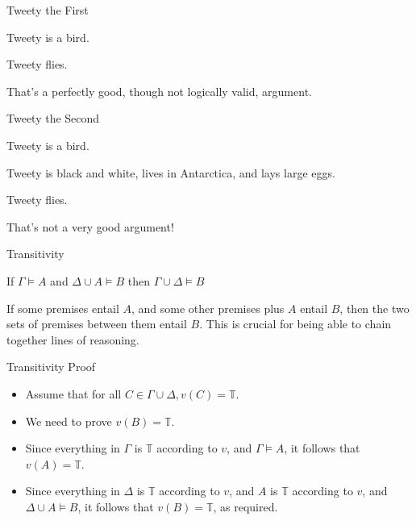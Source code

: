 \documentclass[
  ignorenonframetext,
]{beamer}
\providecommand{\tightlist}{%
  \setlength{\itemsep}{0pt}\setlength{\parskip}{0pt}}
\renewcommand{\,}{\text{, }}
\renewenvironment*{quote}	
	{\list{}{\rightmargin   \leftmargin} \item } 	
	{\endlist }
\def\True{\mathbb{T}}
\begin{document}
\begin{frame}{Tweety the First}
\protect\hypertarget{tweety-the-first}{}
\begin{description}
\tightlist
\item[~]
Tweety is a bird.
\item[\(\therefore\)]
Tweety flies.
\end{description}

That's a perfectly good, though not logically valid, argument.
\end{frame}

\begin{frame}{Tweety the Second}
\protect\hypertarget{tweety-the-second}{}
\begin{description}
\tightlist
\item[~]
Tweety is a bird.
\item[~]
Tweety is black and white, lives in Antarctica, and lays large eggs.
\item[\(\therefore\)]
Tweety flies.
\end{description}

That's not a very good argument!
\end{frame}

\begin{frame}{Transitivity}
\protect\hypertarget{transitivity}{}
\begin{quote}
If \(\Gamma \vDash A\) and \(\Delta \cup A \vDash B\) then
\(\Gamma \cup \Delta \vDash B\)
\end{quote}

If some premises entail \(A\), and some other premises plus \(A\) entail
\(B\), then the two sets of premises between them entail \(B\).
\pause This is crucial for being able to chain together lines of
reasoning.
\end{frame}

\begin{frame}{Transitivity Proof}
\protect\hypertarget{transitivity-proof}{}
\begin{itemize}
\tightlist
\item
  Assume that for all \(C \in \Gamma \cup \Delta, v(C) = \True\).
\item
  We need to prove \(v(B) = \True\).\pause
\item
  Since everything in \(\Gamma\) is \(\True\) according to \(v\), and
  \(\Gamma \vDash A\), it follows that \(v(A) = \True\).\pause
\item
  Since everything in \(\Delta\) is \(\True\) according to \(v\), and
  \(A\) is \(\True\) according to \(v\), and \(\Delta \cup A \vDash B\),
  it follows that \(v(B) = \True\), as required.
\end{itemize}
\end{frame}
\end{document}
